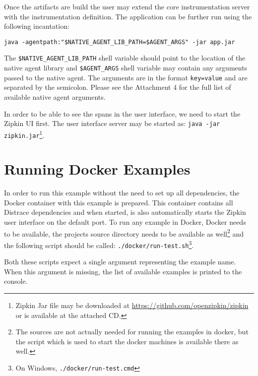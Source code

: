 \documentclass[12pt,a4paper]{report}
\begin{document}
Once the artifacts are build the user may extend the core instrumentation server with the instrumentation definition. The application can be further run using the following incantation:

\texttt{java -agentpath:"\$NATIVE\_AGENT\_LIB\_PATH=\$AGENT\_ARGS" -jar app.jar}

The \texttt{\$NATIVE\_AGENT\_LIB\_PATH} shell variable should point to the location of the native agent library and \texttt{\$AGENT\_ARGS} shell variable may contain any arguments passed to the native agent. The arguments are in the format \texttt{key=value} and are separated by the semicolon. Please see the Attachment 4 for the full list of available native agent arguments.

In order to be able to see the spans in the user interface, we need to start the Zipkin UI first. The user interface server may be started as: \texttt{java -jar zipkin.jar}\footnote{Zipkin Jar file may be downloaded at \url{https://github.com/openzipkin/zipkin} or is available at the attached CD.}.
\section{Running Docker Examples}
 In order to run this example without the need to set up all dependencies, the Docker container with this example is prepared. This container contains all Distrace dependencies and when started, is also automatically starts the Zipkin user interface on the default port. To run any example in Docker, Docker needs to be available, the projects source directory needs to be available as well\footnote{The sources are not actually needed for running the examples in docker, but the script which is used to start the docker machines is available there as well.} and the following script should be called: \texttt{./docker/run-test.sh}\footnote{On Windows, \texttt{./docker/run-test.cmd}}. 
 
Both these scripts expect a single argument representing the example name. When this argument is missing, the list of available examples is printed to the console.
\setcounter{page}{1}
\end{document}
